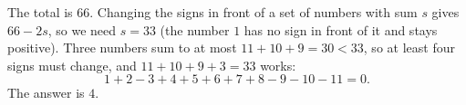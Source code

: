The total is $66$. Changing the signs in front of a set of numbers with sum $s$ gives $66-2s$, so we need $s=33$ (the number $1$ has no sign in front of it and stays positive). Three numbers sum to at most $11+10+9=30<33$, so at least four signs must change, and $11+10+9+3=33$ works:
\[1+2-3+4+5+6+7+8-9-10-11=0.\]
The answer is $\boxed{4}$.

